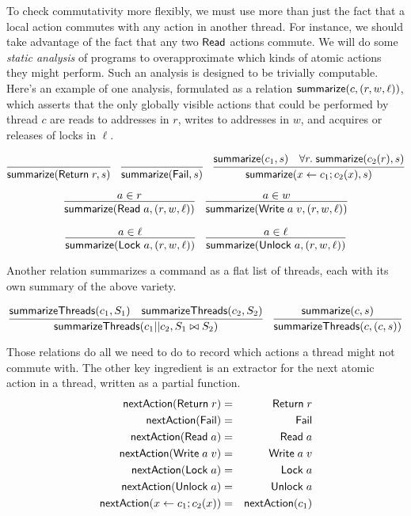 \documentclass{amsbook}
\theoremstyle{definition}
\theoremstyle{remark}
\numberwithin{section}{chapter}
\numberwithin{equation}{chapter}
\begin{document}
To check commutativity more flexibly, we must use more than just the fact that a local action commutes with any action in another thread.
For instance, we should take advantage of the fact that any two $\mathsf{Read}$ actions commute.
We will do some \emph{static analysis} of programs to overapproximate which kinds of atomic actions they might perform.
Such an analysis is designed to be trivially computable.
Here's an example of one analysis, formulated as a relation $\mathsf{summarize}(c, (r, w, \ell))$, which asserts that the only globally visible actions that could be performed by thread $c$ are reads to addresses in $r$, writes to addresses in $w$, and acquires or releases of locks in $\ell$.

$$\infer{\summ{\mt{Return} \; r}{s}}{}
\quad \infer{\summ{\mt{Fail}}{s}}{}
\quad \infer{\summ{x \leftarrow c_1; c_2(x)}{s}}{
    \summ{c_1}{s}
    & \forall r. \; \summ{c_2(r)}{s}
}$$

$$\infer{\summ{\mt{Read} \; a}{(r, w, \ell)}}{
  a \in r
}
\quad \infer{\summ{\mt{Write} \; a \; v}{(r, w, \ell)}}{
  a \in w
}$$

$$\infer{\summ{\mt{Lock} \; a}{(r, w, \ell)}}{
  a \in \ell
}
\quad \infer{\summ{\mt{Unlock} \; a}{(r, w, \ell)}}{
  a \in \ell
}$$

Another relation summarizes a command as a flat list of threads, each with its own summary of the above variety.

\newcommand{\summT}[2]{\mt{summarizeThreads}(#1, #2)}

$$\infer{\summT{c_1 || c_2}{\concat{S_1}{S_2}}}{
  \summT{c_1}{S_1}
  & \summT{c_2}{S_2}
}
\quad \infer{\summT{c}{(c, s)}}{
  \summ{c}{s}
}$$

\newcommand{\na}[1]{\mt{nextAction}(#1)}

Those relations do all we need to do to record which actions a thread might not commute with.
The other key ingredient is an extractor for the next atomic action in a thread, written as a partial function.
\begin{eqnarray*}
  \na{\mt{Return} \; r} &=& \mt{Return} \; r \\
  \na{\mt{Fail}} &=& \mt{Fail} \\
  \na{\mt{Read} \; a} &=& \mt{Read} \; a \\
  \na{\mt{Write} \; a \; v} &=& \mt{Write} \; a \; v \\
  \na{\mt{Lock} \; a} &=& \mt{Lock} \; a \\
  \na{\mt{Unlock} \; a} &=& \mt{Unlock} \; a \\
  \na{x \leftarrow c_1; c_2(x)} &=& \na{c_1}
\end{eqnarray*}
\end{document}
